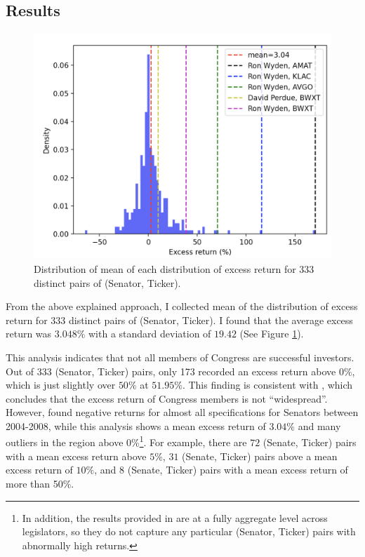 \documentclass[12pt,letterpaper]{article}
\begin{document}
\subsection{Results}

\begin{figure}[h!]
  \centering
  \includegraphics[width=1\textwidth]{imgs/ex-r/aggregate.png}
  \caption{Distribution of mean of each distribution of excess return for $333$ distinct pairs of (Senator, Ticker).}
  \label{fig:agg-ex-r}
\end{figure}

From the above explained approach, I collected mean of the distribution of excess return for $333$ distinct pairs of (Senator, Ticker). I found that the average excess return was $3.048\%$ with a standard deviation of $19.42$ (See Figure \ref{fig:agg-ex-r}). 

This analysis indicates that not all members of Congress are successful investors. Out of 333 (Senator, Ticker) pairs, only 173 recorded an excess return above $0\%$, which is just slightly over $50\%$ at $51.95\%$. This finding is consistent with \cite{eg13}, 
which concludes that the excess return of Congress members is not ``widespread''. However, \cite{eg13} found negative returns for almost all specifications for Senators between 2004-2008, 
while this analysis shows a mean excess return of $3.04\%$ and many outliers in the region above 0\%\footnote{In addition, the results provided in \cite{eg13} are at a fully aggregate level across legislators, so they do not capture any particular (Senator, Ticker) pairs with abnormally high returns.}. 
For example, there are $72$ (Senate, Ticker) pairs with a mean excess return above $5\%$, $31$ (Senate, Ticker) pairs above a mean excess return of $10\%$, and $8$ (Senate, Ticker) pairs with a mean excess return of more than 50\%.
\end{document}
